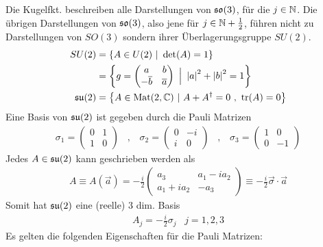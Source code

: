 Die Kugelfkt. beschreiben alle Darstellungen von $\mathfrak{so}(3)$, für die $j \in \mathbb{N}$.
Die übrigen Darstellungen von $\mathfrak{so}(3)$, also jene für $j \in \mathbb{N} + \frac{1}{2}$,
führen nicht zu Darstellungen von $SO(3)$ sondern ihrer Überlagerungsgruppe
$SU(2)$.
\begin{align*}
    SU(2) &= \left\{ A \in U(2) \ | \ \det(A) = 1 \right\}
    \\
    &= \left\{ g = \begin{pmatrix}
        a & b \\ -\overline{b} & \overline{a}
    \end{pmatrix} \ \Big| \ \left\vert a \right\vert^2 + \left\vert b \right\vert^2 = 1 \right\}
    \\
    \mathfrak{su}(2) &= \left\{ A \in \text{Mat}(2,\mathbb{C}) \ | \ A + A^\dagger = 0 \ , \ \text{tr}(A) = 0 \right\}
\end{align*}
Eine Basis von $\mathfrak{su}(2)$ ist gegeben durch die Pauli Matrizen
\begin{align*}
    \sigma_1 = \begin{pmatrix}
        0 & 1 \\ 1 & 0
    \end{pmatrix}
    \hspace{10pt} , \hspace{10pt}
    \sigma_2 = \begin{pmatrix}
        0 & -i \\ i & 0
    \end{pmatrix}
    \hspace{10pt} , \hspace{10pt}
    \sigma_3 = \begin{pmatrix}
        1 & 0 \\ 0 & -1
    \end{pmatrix}
\end{align*}
Jedes $A \in \mathfrak{su}(2)$ kann geschrieben werden als
\begin{align*}
    A \equiv A(\vec{a}) = -\frac{i}{2} \begin{pmatrix}
        a_3 & a_1 - i a_2 \\ a_1 + i a_2 & -a_3
    \end{pmatrix}
    \equiv - \frac{i}{2} \vec{\sigma} \cdot \vec{a}
\end{align*}
Somit hat $\mathfrak{su}(2)$ eine (reelle) 3 dim. Basis
\begin{align*}
    A_j = -\frac{i}{2} \sigma_j
    \hspace{10pt} j=1,2,3
\end{align*}
Es gelten die folgenden Eigenschaften für die Pauli Matrizen:
